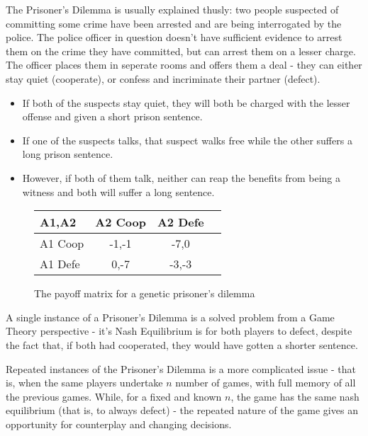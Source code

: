\documentclass{article}
\begin{document}
The Prisoner's Dilemma is usually explained thusly: two people suspected of committing some crime have been arrested and are being interrogated by the police. The police officer in question doesn't have sufficient evidence to arrest them on the crime they have committed, but can arrest them on a lesser charge. The officer places them in seperate rooms and offers them a deal - they can either stay quiet (cooperate), or confess and incriminate their partner (defect).
\begin{itemize}
	\item If both of the suspects stay quiet, they will both be charged with the lesser offense and given a short prison sentence.
	\item If one of the suspects talks, that suspect walks free while the other suffers a long prison sentence.
	\item However, if both of them talk, neither can reap the benefits from being a witness and both will suffer a long sentence.
\end{itemize}
	\begin{figure}
		\label{fig:generic-prisoners-dilemma}
		\caption{The payoff matrix for a genetic prisoner's dilemma}
		\begin{tabular}{| l || c | c | c |}
			\hline
			A1,A2 & A2 Coop & A2 Defe \\ \hline
			A1 Coop & -1,-1 & -7,0 \\ \hline  
			A1 Defe & 0,-7 & -3,-3  \\ \hline
		\end{tabular}
	\end{figure}

A single instance of a Prisoner's Dilemma is a solved problem from a Game Theory perspective - it's Nash Equilibrium is for both players to defect, despite the fact that, if both had cooperated, they would have gotten a shorter sentence.

Repeated instances of the Prisoner's Dilemma is a more complicated issue - that is, when the same players undertake $n$ number of games, with full memory of all the previous games. While, for a fixed and known $n$, the game has the same nash equilibrium (that is, to always defect) - the repeated nature of the game gives an opportunity for counterplay and changing decisions.
\end{document}
